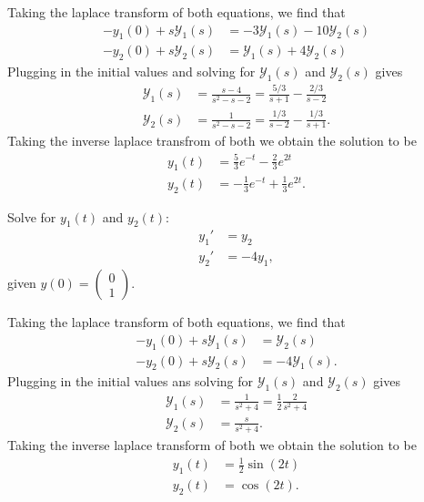 \begin{soln}
    Taking the laplace transform of both equations, we find that
    \begin{align*}
        -y_1(0) + s\mathcal{Y}_1(s) &= -3\mathcal{Y}_1(s)-10\mathcal{Y}_2(s) \\
        -y_2(0) + s\mathcal{Y}_2(s) &= \mathcal{Y}_1(s)+4\mathcal{Y}_2(s)
    \end{align*}
    Plugging in the initial values and solving for $\mathcal{Y}_1(s)$ and
    $\mathcal{Y}_2(s)$ gives
    \begin{align*}
        \mathcal{Y}_1(s) &= \frac{s-4}{s^2-s-2} = \frac{5/3}{s+1}-\frac{2/3}{s-2}\\
        \mathcal{Y}_2(s) &= \frac{1}{s^2-s-2} = \frac{1/3}{s-2}-\frac{1/3}{s+1}.
    \end{align*}
    Taking the inverse laplace transfrom of both we obtain the solution to be
    \begin{align*}
        y_1(t) &= \frac{5}{3}e^{-t}-\frac{2}{3}e^{2t} \\
        y_2(t) &= -\frac{1}{3}e^{-t} + \frac{1}{3}e^{2t}.
    \end{align*}
\end{soln}

\begin{example}
    Solve for $y_1(t)$ and $y_2(t)$:
    \begin{align*}
        y_1' &= y_2 \\
        y_2' &= -4y_1,
    \end{align*}
    given $y(0) = \begin{pmatrix} 0 \\ 1 \end{pmatrix}$.
\end{example}

\begin{soln}
    Taking the laplace transform of both equations, we find that
    \begin{align*}
        -y_1(0)+s\mathcal{Y}_1(s) &= \mathcal{Y}_2(s) \\
        -y_2(0)+s\mathcal{Y}_2(s) &= -4\mathcal{Y}_1(s).
    \end{align*}
    Plugging in the initial values ans solving for $\mathcal{Y}_1(s)$ and
    $\mathcal{Y}_2(s)$ gives
    \begin{align*}
        \mathcal{Y}_1(s) &= \frac{1}{s^2+4} = \frac{1}{2}\frac{2}{s^2+4}\\
        \mathcal{Y}_2(s) &= \frac{s}{s^2+4}.
    \end{align*}
    Taking the inverse laplace transform of both we obtain the solution to be
    \begin{align*}
        y_1(t) &= \frac{1}{2}\sin(2t) \\
        y_2(t) &= \cos(2t).
    \end{align*}
\end{soln}

